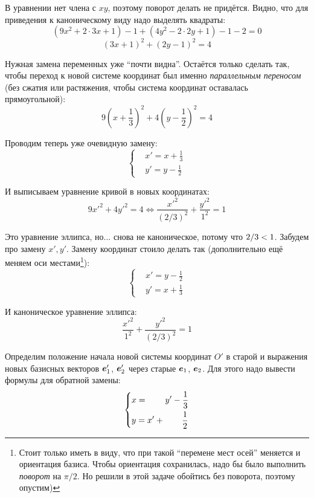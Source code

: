 \documentclass[a4paper,12pt]{article}
\begin{document}
  \begin{solution}
    В уравнении нет члена с $xy$, поэтому поворот делать не придётся.
    Видно, что для приведения к каноническому виду надо выделять квадраты:
    \[
      (9x^2 + 2 \cdot 3x + 1) - 1 + (4y^2 - 2 \cdot 2y + 1) - 1 - 2 = 0
    \]
    \[
      (3x + 1)^2 + (2y - 1)^2 = 4
    \]
    
    Нужная замена переменных уже ``почти видна''.
    Остаётся только сделать так, чтобы переход к новой системе координат был именно \emph{параллельным переносом} (без сжатия или растяжения, чтобы система координат оставалась прямоугольной):
    \[
      9 \left(x + \frac{1}{3}\right)^2 + 4 \left(y - \frac{1}{2}\right)^2 = 4
    \]
    
    Проводим теперь уже очевидную замену:
    \[
      \left\{
        \begin{aligned}
          &x' = x + \frac{1}{3}\\
          &y' = y - \frac{1}{2}
        \end{aligned}
      \right.
    \]
    
    И выписываем уравнение кривой в новых координатах:
    \[
      9 x'^2 + 4 y'^2 = 4 \Leftrightarrow \frac{x'^2}{(2/3)^2} + \frac{y'^2}{1^2} = 1
    \]
    
    Это уравнение эллипса, но... снова не каноническое, потому что $2/3 \hm< 1$.
    Забудем про замену $x', y'$.
    Замену координат стоило делать так (дополнительно ещё меняем оси местами\footnote{Стоит только иметь в виду, что при такой ``перемене мест осей'' меняется и ориентация базиса. Чтобы ориентация сохранилась, надо бы было выполнить \emph{поворот} на $\pi/2$. Но решили в этой задаче обойтись без поворота, поэтому опустим)}):
    \[
      \left\{
        \begin{aligned}
          &x' = y - \frac{1}{2}\\
          &y' = x + \frac{1}{3}
        \end{aligned}
      \right.
    \]
    
    И каноническое уравнение эллипса:
    \[
      \frac{x'^2}{1^2} + \frac{y'^2}{(2/3)^2} = 1
    \]
    
    Определим положение начала новой системы координат $O'$ в старой и выражения новых базисных векторов $\boldsymbol e_1'$, $\boldsymbol e_2'$ через старые $\boldsymbol e_1$, $\boldsymbol e_2$.
    Для этого надо вывести формулы для обратной замены:
    \[
      \left\{
        \begin{aligned}
          &x = \hphantom{x' + {}} y' - \frac{1}{3}\\
          &y = x' + \hphantom{y' + {}} \frac{1}{2}
        \end{aligned}
      \right.
    \]
    

\end{solution}
\end{document}
